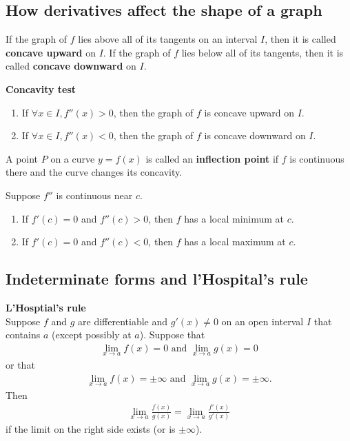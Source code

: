 \documentclass{article}
\begin{document}
\subsection{How derivatives affect the shape of a graph}
\begin{definition}
    If the graph of $f$ lies above all of its tangents on an interval $I$, then it is called \textbf{concave upward} on $I$. If the graph of $f$ lies below all of its tangents, then it is called \textbf{concave downward} on $I$.
\end{definition}
\begin{theorem}
    \textbf{Concavity test}
    \begin{enumerate}
        \item If $\forall x\in I, f''(x)>0$, then the graph of $f$ is concave upward on $I$.
        \item If $\forall x\in I, f''(x)<0$, then the graph of $f$ is concave downward on $I$.
    \end{enumerate}
\end{theorem}
\begin{definition}
    A point $P$ on a curve $y=f(x)$ is called an \textbf{inflection point} if $f$ is continuous there and the curve changes its concavity.
\end{definition}
\begin{theorem}
    Suppose $f''$ is continuous near $c$.
    \begin{enumerate}
        \item If $f'(c)=0$ and $f''(c)>0$, then $f$ has a local minimum at $c$.
        \item If $f'(c)=0$ and $f''(c)<0$, then $f$ has a local maximum at $c$.
    \end{enumerate}
\end{theorem}
\subsection{Indeterminate forms and l'Hospital's rule}
\begin{theorem}
    \textbf{L'Hosptial's rule}\\
    Suppose $f$ and $g$ are differentiable and $g'(x)\not=0$ on an open interval $I$ that contains $a$ (except possibly at $a$). Suppose that
    \begin{align*}
        \lim_{x\to a}f(x)=0\text{ and } \lim_{x\to a}g(x)=0
    \end{align*}
    or that
    \begin{align*}
        \lim_{x\to a}f(x)=\pm\infty \text{ and } \lim_{x\to a}g(x) = \pm\infty.
    \end{align*}
    Then
    \begin{align*}
        \lim_{x\to a}\frac{f(x)}{g(x)}=\lim_{x\to a}\frac{f'(x)}{g'(x)}
    \end{align*}
    if the limit on the right side exists (or is $\pm\infty$).
\end{theorem}
\setcounter{subsection}{6}
\end{document}

